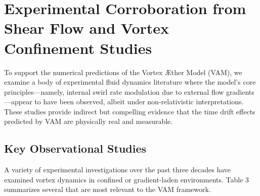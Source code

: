 
\section{Experimental Corroboration from Shear Flow and Vortex Confinement Studies}

To support the numerical predictions of the Vortex Æther Model (VAM), we examine a body of experimental fluid dynamics literature where the model's core principles---namely, internal swirl rate modulation due to external flow gradients---appear to have been observed, albeit under non-relativistic interpretations. These studies provide indirect but compelling evidence that the time drift effects predicted by VAM are physically real and measurable.


\subsection{Key Observational Studies}

A variety of experimental investigations over the past three decades have examined vortex dynamics in confined or gradient-laden environments. Table 3 summarizes several that are most relevant to the VAM framework.

